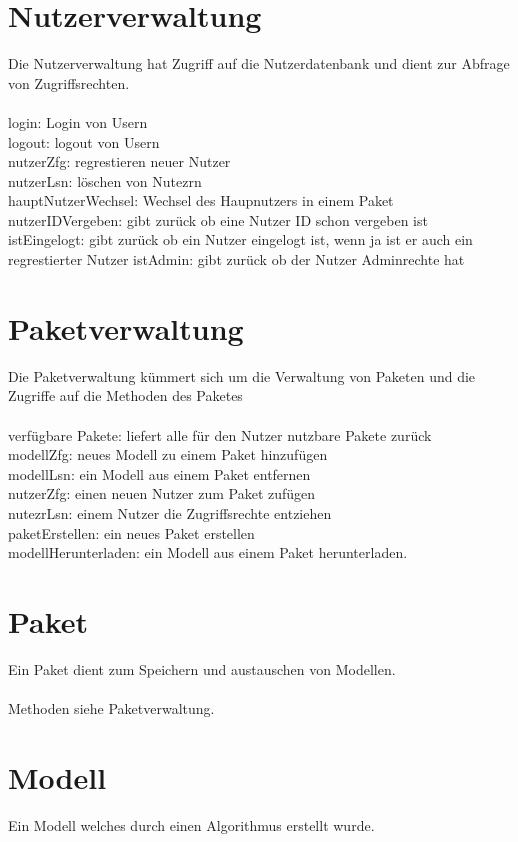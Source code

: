 \documentclass{book}
\begin{document}
\section{Nutzerverwaltung}
Die Nutzerverwaltung hat Zugriff auf die Nutzerdatenbank und dient zur Abfrage von Zugriffsrechten.\\
\\
login: Login von Usern \\
logout: logout von Usern\\
nutzerZfg: regrestieren neuer Nutzer\\
nutzerLsn: löschen von Nutezrn\\
hauptNutzerWechsel: Wechsel des Haupnutzers in einem Paket\\
nutzerIDVergeben: gibt zurück ob eine Nutzer ID schon vergeben ist\\
istEingelogt: gibt zurück ob ein Nutzer eingelogt ist, wenn ja ist er auch ein regrestierter Nutzer
istAdmin: gibt zurück ob der Nutzer Adminrechte hat

\section{Paketverwaltung}
Die Paketverwaltung kümmert sich um die Verwaltung von Paketen und die Zugriffe auf die Methoden des Paketes\\
\\
verfügbare Pakete: liefert alle für den Nutzer nutzbare Pakete zurück\\
modellZfg: neues Modell zu einem Paket hinzufügen\\
modellLsn: ein Modell aus einem Paket entfernen\\
nutzerZfg: einen neuen Nutzer zum Paket zufügen\\
nutezrLsn: einem Nutzer die Zugriffsrechte entziehen\\
paketErstellen: ein neues Paket erstellen\\
modellHerunterladen: ein Modell aus einem Paket herunterladen.\\

\section{Paket}
Ein Paket dient zum Speichern und austauschen von Modellen.\\
\\
Methoden siehe Paketverwaltung.

\section{Modell}
Ein Modell welches  durch einen Algorithmus erstellt wurde.
\end{document}
